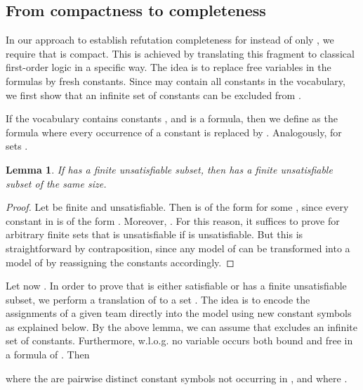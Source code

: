 \documentclass[a4paper,english,fleqn,11pt,final]{scrartcl}
\makeatletter
\newcommand{\wloss}{w.l.o.g.\@\xspace}
\theoremstyle{plain}
\newtheorem{lemma}[theorem]{Lemma}
\theoremstyle{definition}
\makeatother
\begin{document}
\subsection{From compactness to completeness}


In our approach to establish refutation completeness for  instead of only , we require that  is compact.
This is achieved by translating this fragment to classical first-order logic in a specific way.
The idea is to replace free variables in the formulas by fresh constants.
Since  may contain all constants in the vocabulary, we first show that an infinite set of constants can be excluded from .

If the vocabulary contains constants , and  is a formula, then we define  as the formula where every occurrence of a constant  is replaced by .
Analogously,  for sets .

\begin{lemma}
If  has a finite unsatisfiable subset, then  has a finite unsatisfiable subset of the same size.
\end{lemma}
\begin{proof}
Let  be finite and unsatisfiable.
Then  is of the form  for some , since every constant in  is of the form .
Moreover, .
For this reason, it suffices to prove for arbitrary finite sets  that  is unsatisfiable if  is unsatisfiable.
But this is straightforward by contraposition, since any model  of  can be transformed into a model of  by reassigning the constants accordingly.
\end{proof}

\smallskip

Let now .
In order to prove that  is either satisfiable or has a finite unsatisfiable subset, we perform a translation of  to a set .
The idea is to encode the assignments of a given team directly into the model using new constant symbols  as explained below.
By the above lemma, we can assume that  excludes an infinite set of constants.
Furthermore, \wloss no variable occurs both bound and free in a formula of .
Then

where the  are pairwise distinct constant symbols not occurring in , and where .
\end{document}
